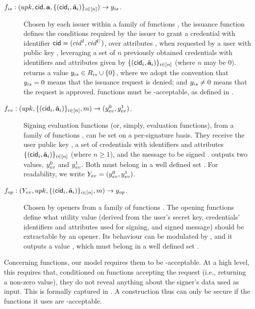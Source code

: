 \begin{description}
\item[$f_{is}: (upk,\mathsf{cid},\mathbf{a},\lbrace (\mathsf{cid}_i,\tilde{\mathbf{a}}_i)\rbrace_{i \in [n]})
  \rightarrow y_{is}$.] Chosen
  by each issuer within a family of functions \famfissue, the issuance function
  defines the conditions required by the issuer to grant a credential
  with identifier $\mathsf{cid} = (cid^I,cid^U)$, over attributes \attrs, when requested
  by a user with public key \upk, leveraging a set of $n$ previously obtained
  credentials with identifiers and attributes given by $\lbrace (\mathsf{cid}_i,
  \tilde{\mathbf{a}}_i) \rbrace_{i \in [n]}$ (where $n$ may be $0$). \fissue returns
  a value $y_{is} \in R_{is} \cup \lbrace 0 \rbrace$, where we adopt the
  convention that $y_{is} = 0$ means that the issuance request is denied; and
  $y_{is} \neq 0$ means that the request is approved. \fissue functions must be
  \UAS-acceptable, as defined in .
\item[$f_{ev}: (upk,\lbrace(\mathsf{cid}_i,\tilde{\mathbf{a}}_i)\rbrace_{i \in [n]},m)
  \rightarrow (y_{ev}^0,y_{ev}^1)$.] Signing evaluation functions (or, simply,
  evaluation functions), from a
  family of functions \famfeval, can be set on a per-signature basis. They
  receive the user public key \upk, a set of credentials with identifiers
  and attributes $\lbrace (\mathsf{cid}_i,\tilde{\mathbf{a}}_i) \rbrace_{i \in [n]}$
  (where $n \ge 1$), and the message to be signed \msg. \feval outputs two
  values, $y_{ev}^0$ and $y_{ev}^1$. Both must belong in a well defined set
  \rngfeval. For readability, we write $Y_{ev} = (y_{ev}^0,y_{ev}^1)$.
\item[$f_{op}: (Y_{ev},upk,\lbrace (\mathsf{cid}_i,\tilde{\mathbf{a}}_i) \rbrace_{i \in [n]},
  m) \rightarrow y_{op}$.]
  Chosen by openers from a family of functions \famfinsp. The opening
  functions define what utility value (derived from the user's secret key,
  credentials' identifiers and attributes used for signing, and signed message)
  should be extractable by an opener. Its behaviour can be modulated by \Yeval,
  and it outputs a value \yinsp, which must belong in a well defined set
  \rngfinsp.
\end{description}

Concerning \fissue functions, our \UAS model requires them to be
\UAS-acceptable. At a high level, this requires that, conditioned on \fissue
functions accepting the request (i.e., returning a non-zero value), they do not
reveal anything about the signer's data used as input. This is formally captured
in .
%
A \UAS construction thus can only be secure if the \fissue functions it uses
are \UAS-acceptable.

